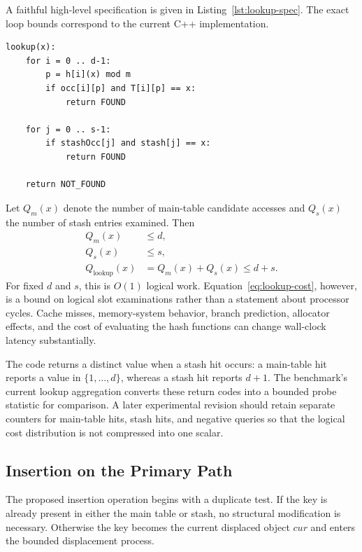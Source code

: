 \documentclass[conference]{IEEEtran}
\begin{document}
A faithful high-level specification is given in Listing~\ref{lst:lookup-spec}. The exact loop bounds correspond to the current C++ implementation.

\begin{lstlisting}[caption={Implementation-consistent pseudocode for proposed lookup},label={lst:lookup-spec}]
lookup(x):
    for i = 0 .. d-1:
        p = h[i](x) mod m
        if occ[i][p] and T[i][p] == x:
            return FOUND

    for j = 0 .. s-1:
        if stashOcc[j] and stash[j] == x:
            return FOUND

    return NOT_FOUND
\end{lstlisting}

Let $Q_m(x)$ denote the number of main-table candidate accesses and $Q_s(x)$ the number of stash entries examined. Then
\begin{equation}
\begin{split}
    Q_m(x) &\le d, \\
    Q_s(x) &\le s, \\
    Q_{\mathrm{lookup}}(x) &= Q_m(x)+Q_s(x) \le d+s.
\end{split}
\label{eq:lookup-cost}
\end{equation}
For fixed $d$ and $s$, this is $O(1)$ logical work. Equation~\eqref{eq:lookup-cost}, however, is a bound on logical slot examinations rather than a statement about processor cycles. Cache misses, memory-system behavior, branch prediction, allocator effects, and the cost of evaluating the hash functions can change wall-clock latency substantially.

The code returns a distinct value when a stash hit occurs: a main-table hit reports a value in $\{1,\ldots,d\}$, whereas a stash hit reports $d+1$. The benchmark's current lookup aggregation converts these return codes into a bounded probe statistic for comparison. A later experimental revision should retain separate counters for main-table hits, stash hits, and negative queries so that the logical cost distribution is not compressed into one scalar.

\subsection{Insertion on the Primary Path}

The proposed insertion operation begins with a duplicate test. If the key is already present in either the main table or stash, no structural modification is necessary. Otherwise the key becomes the current displaced object $cur$ and enters the bounded displacement process.
\end{document}
